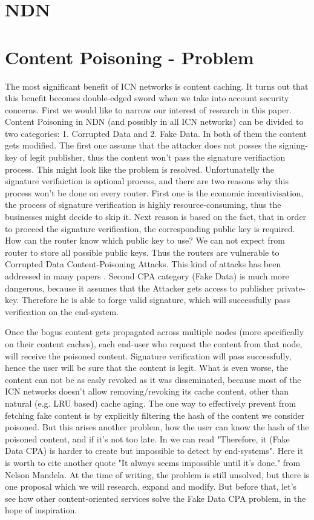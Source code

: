 \documentclass[nostrict]{szablonPG}
\begin{document}
\section{NDN}


\section{Content Poisoning - Problem}
The most significant benefit of ICN networks is content caching. It turns out that this benefit becomes double-edged sword when we take into account security concerns. 
First we would like to narrow our interest of research in this paper. Content Poisoning in NDN (and possibly in all ICN networks) can be divided to two categories: 1. Corrupted Data and 2. Fake Data. In both of them the content gets modified. The first one assume that the attacker does not posses the signing-key of legit publisher, thus the content won't pass the signature verifiaction process. This might look like the problem is resolved. Unfortunatelly the signature verifaiction is optional process, and there are two reasons why this process won't be done on every router. First one is the economic incentivisation, the process of signature verification is highly resource-consuming, thus the businesses might decide to skip it. Next reason is based on the fact, that in order to proceed the signature verification, the corresponding public key is required. How can the router know which public key to use? We can not expect from router to store all possible public keys. Thus the routers are vulnerable to Corrupted Data Content-Poisoning Attacks. This kind of attacks has been addressed in many papers \cite{ghali2014needle} \cite{yu2018content} \cite{nguyen2017content}. Second CPA category (Fake Data) is much more dangerous, because it assumes that the Attacker gets access to publisher private-key. Therefore he is able to forge valid signature, which will successfully pass verification on the end-system. 

Once the bogus content gets propagated across multiple nodes (more specifically on their content caches), each end-user who request the content from that node, will receive the poisoned content. Signature verification will pass successfully, hence the user will be sure that the content is legit. What is even worse, the content can not be as easly revoked as it was disseminated, because most of the ICN networks doesn't allow removing/revoking its cache content, other than natural (e.g. LRU based) cache aging. The one way to effectively prevent from fetching fake content is by explicitly filtering the hash of the content we consider poisoned. But this arises another problem, how the user can know the hash of the poisoned content, and if it's not too late. In \cite{nguyen2017content} we can read "Therefore, it (Fake Data CPA) is harder to create but impossible to detect by end-systems". Here it is worth to cite another quote "It always seems impossible until it's done." from Nelson Mandela. At the time of writing, the problem is still unsolved, but there is one proposal \cite{jekon2019content} which we will research, expand and modify. But before that, let's see how other content-oriented services solve the Fake Data CPA problem, in the hope of inspiration.
\end{document}
